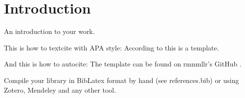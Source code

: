 \chapter*{Introduction}\label{ch:introduction}

An introduction to your work.

This is how to textcite with APA style: According to \textcite{muller_github_2023} this is a template.

And this is how to autocite: The template can be found on rmnmllr's GitHub \autocite{muller_github_2023}.

Compile your library in BibLatex format by hand (see references.bib) or using Zotero, Mendeley and any other tool.
